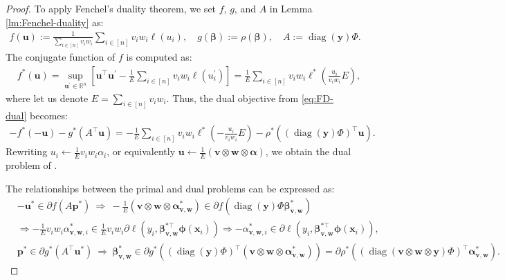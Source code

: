 	\begin{proof}
	To apply Fenchel's duality theorem, we set $f$, $g$, and $A$ in Lemma \ref{lm:Fenchel-duality} as:
	\begin{align*}
	f(\bm u) := \frac{1}{\sum_{i\in[n]} v_i w_i} \sum_{i \in\left[n\right]} v_i w_i \ell(u_i),
	\quad
	g(\bm\beta) := \rho(\bm\beta),
	\quad
	A := \operatorname{diag}(\bm y)\Phi.
	\end{align*}
	The conjugate function of $f$ is computed as:
	\begin{align*}
	& f^*(\bm u)
		= \sup_{\bm u^\prime\in\mathbb{R}^n} \left[\bm u^\top \bm u^\prime - \frac{1}{E} \sum_{i \in\left[n\right]} v_i w_i \ell(u^\prime_i)\right]
		= \frac{1}{E} \sum_{i \in\left[n\right]} v_i w_i \ell^*\left(\frac{u_i}{v_i w_i} {E} \right),
	\end{align*}
	where let us denote $E = \sum_{i\in[n]} v_i w_i$.
	Thus, the dual objective from \eqref{eq:FD-dual} becomes:
	\begin{align*}
	-f^*(-\bm u) - g^*(A^\top \bm u)
	= - \frac{1}{E} \sum_{i \in\left[n\right]} v_i w_i \ell^*\left(- \frac{u_i}{v_i w_i} {E} \right) - \rho^*((\operatorname{diag}(\bm y)\Phi)^\top \bm u).
	\end{align*}
	Rewriting $u_i \leftarrow \frac{1}{E} v_i w_i \alpha_i$, or equivalently $\bm u \leftarrow \frac{1}{E} (\bm v \otimes \bm w \otimes \bm\alpha)$, we obtain the dual problem of \red{\eqref{eq:dual}}.
	
	The relationships between the primal and dual problems can be expressed as:
	\begin{align*}
	& -\bm u^* \in \partial f(A \bm p^*)
		~\Rightarrow~
		-\frac{1}{E}(\bm v \otimes \bm w \otimes \bm\alpha_{\bm v, \bm w}^*) \in \partial f(\operatorname{diag}(\bm y)\Phi \bm\beta_{\bm v, \bm w}^*)\\
		& \Rightarrow
		-\frac{1}{E}v_i w_i \alpha^*_{\bm v, \bm w, i} \in \frac{1}{E}v_i w_i \partial\ell(y_i, \bm\beta_{\bm v, \bm w}^{* \top} \bm\phi(\bm{x}_i))
		\Rightarrow -\alpha^*_{\bm v, \bm w, i} \in \partial\ell(y_i, \bm\beta_{\bm v, \bm w}^{* \top} \bm\phi(\bm{x}_i)), \\
		& \bm p^* \in \partial g^*(A^\top \bm u^*)
		~\Rightarrow~
		\bm\beta_{\bm v, \bm w}^* \in \partial g^*((\operatorname{diag}(\bm y)\Phi)^\top (\bm v \otimes \bm w \otimes \bm\alpha_{\bm v, \bm w}^*))
		= \partial\rho^*((\operatorname{diag}(\bm v \otimes \bm w \otimes \bm y)\Phi)^\top \bm\alpha_{\bm v, \bm w}^*).
	\end{align*}
	\end{proof}
